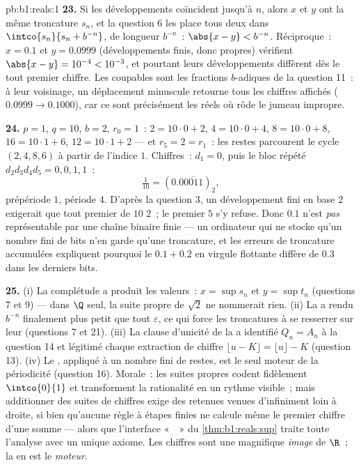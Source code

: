 \begin{solution}{pb:b1:reals:1}
\textbf{23.} Si les développements coïncident jusqu'à $n$, alors $x$
et $y$ ont la même troncature $s_n$, et la question 6 les place tous
deux dans $\intco{s_n}{s_n + b^{-n}}$,  de longueur
$b^{-n}$~: $\abs{x - y} < b^{-n}$. Réciproque~: $x = 0.1$ et $y =
0.0999$ (développements finis, donc propres) vérifient $\abs{x - y}
= 10^{-4} < 10^{-3}$, et pourtant leurs développements diffèrent dès
le tout premier chiffre. Les coupables sont les fractions
$b$-adiques de la question 11~: à leur voisinage, un déplacement
minuscule retourne tous les chiffres affichés ($0.0999 \to
0.1000$), car ce sont précisément les réels où rôde le jumeau
impropre.

\textbf{24.} $p = 1$, $q = 10$, $b = 2$, $r_0 = 1$~: $2 = 10 \cdot
0 + 2$, $4 = 10 \cdot 0 + 4$, $8 = 10 \cdot 0 + 8$, $16 = 10
\cdot 1 + 6$, $12 = 10 \cdot 1 + 2$ --- et $r_5 = 2 = r_1$~: les
restes parcourent le cycle $(2, 4, 8, 6)$ à partir de l'indice $1$.
Chiffres~: $d_1 = 0$, puis le bloc répété $d_2 d_3 d_4 d_5 = 0, 0,
1, 1$~:
\[
\tfrac{1}{10} = (0.0\overline{0011})_2 ,
\]
prépériode $1$, période $4$. D'après la question 3, un développement
fini en base $2$ exigerait que tout premier de $10$  $2$~; le
premier $5$ s'y refuse. Donc $0.1$ n'est \emph{pas} représentable par
une chaîne binaire finie --- un ordinateur qui ne stocke qu'un nombre
fini de bits n'en garde qu'une troncature, et les erreurs de
troncature accumulées expliquent pourquoi le $0.1 + 0.2$ en virgule
flottante diffère de $0.3$ dans les derniers bits.

\textbf{25.} (i) La complétude a produit les valeurs~: $x = \sup s_n$
et $y = \sup t_n$ (questions 7 et 9) --- dans $\Q$ seul, la suite
propre de $\sqrt 2$ ne nommerait rien. (ii) La 
a rendu $b^{-n}$ finalement plus petit que tout $\varepsilon$, ce qui
force les troncatures à se resserrer sur leur 
(questions 7 et 21). (iii) La clause d'unicité de la  a
identifié $Q_n = A_n$ à la question 14 et légitimé chaque extraction
de chiffre $\lfloor u - K \rfloor = \lfloor u \rfloor - K$
(question 13). (iv) Le , appliqué à un nombre
fini de restes, est le seul moteur de la périodicité (question 16).
Morale~: les suites propres codent fidèlement $\intco{0}{1}$ et
transforment la rationalité en un rythme visible~; mais additionner
des suites de chiffres exige des retenues venues d'infiniment loin à
droite, si bien qu'aucune règle à étapes finies ne calcule même le
premier chiffre d'une somme --- alors que l'interface «~~» du \cref{thm:b1:reals:sup} traite toute l'analyse avec
un unique axiome. Les chiffres sont une magnifique \emph{image} de
$\R$~; la  en est le \emph{moteur}.
\end{solution}

